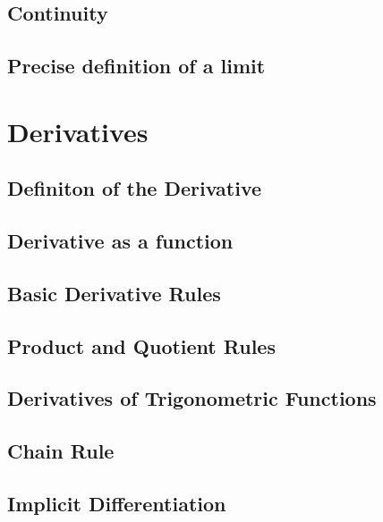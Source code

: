 \documentclass[symmetric,justified,marginals=justified,notoc]{tufte-book}
\theoremstyle{mytheoremstyle}
\begin{document}
\section{Continuity}


\section{Precise definition of a limit}

\chapter{Derivatives}

\section{Definiton of the Derivative}

\lipsum[31-50]

\section{Derivative as a function}

\lipsum[31-50]

\section{Basic Derivative Rules}

\lipsum[31-50]

\section{Product and Quotient Rules}

\lipsum[31-50]

\section{Derivatives of Trigonometric Functions}

\lipsum[31-50]

\section{Chain Rule}

\lipsum[31-50]

\section{Implicit Differentiation}
\end{document}
